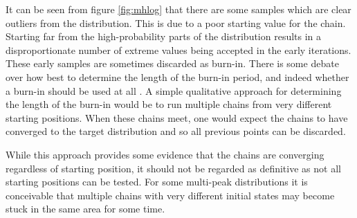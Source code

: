 \documentclass[a4paper,11pt,twoside]{article}
\begin{document}
It can be seen from figure \ref{fig:mhlog} that there are some samples which are clear
outliers from the distribution. This is due to a poor starting value for the
chain. Starting far from the high-probability parts of the distribution results
in a disproportionate number of extreme values being accepted in the early
iterations. These early samples are sometimes discarded as burn-in. There is
some debate over how best to determine the length of the burn-in period, and
indeed whether a burn-in should be used at all \cite{handbook}.
A simple qualitative approach for determining the length of the burn-in 
would be to run multiple chains from very different starting
positions. When these chains meet, one would expect the chains to have
converged to the target distribution and so all previous points can be
discarded. 

While this approach provides some evidence that the chains are converging
regardless of starting position, it should not be regarded as definitive as not
all starting positions can be tested. For some multi-peak distributions it is
conceivable that multiple chains with very different initial states may become
stuck in the same area for some time.
\end{document}
